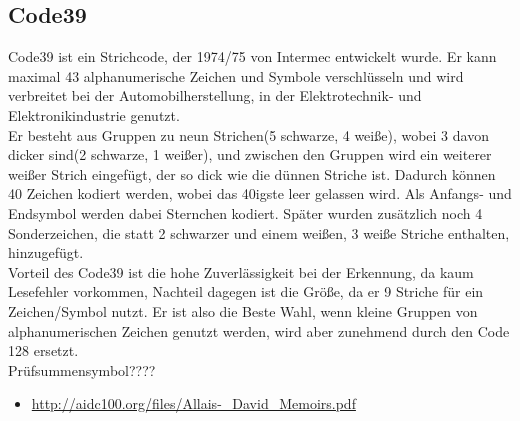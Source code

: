 \subsection*{Code39}
Code39 ist ein Strichcode, der 1974/75 von Intermec entwickelt wurde. Er kann maximal 43 alphanumerische Zeichen und Symbole verschlüsseln und wird verbreitet bei der Automobilherstellung, in der Elektrotechnik- und Elektronikindustrie genutzt.\\
Er besteht aus Gruppen zu neun Strichen(5 schwarze, 4 weiße), wobei 3 davon dicker sind(2 schwarze, 1 weißer), und zwischen den Gruppen wird ein weiterer weißer Strich eingefügt, der so dick wie die dünnen Striche ist. Dadurch können 40 Zeichen kodiert werden, wobei das 40igste leer gelassen wird. Als Anfangs- und Endsymbol werden dabei Sternchen kodiert. Später wurden zusätzlich noch 4 Sonderzeichen, die statt 2 schwarzer und einem weißen, 3 weiße Striche enthalten, hinzugefügt.\\
Vorteil des Code39 ist die hohe Zuverlässigkeit bei der Erkennung, da kaum Lesefehler vorkommen, Nachteil dagegen ist die Größe, da er 9 Striche für ein Zeichen/Symbol nutzt. Er ist also die Beste Wahl, wenn kleine Gruppen von alphanumerischen Zeichen genutzt werden, wird aber zunehmend durch den Code 128 ersetzt.\\
Prüfsummensymbol????
\begin{itemize}
	\item \url{http://aidc100.org/files/Allais-_David_Memoirs.pdf}
\end{itemize}
